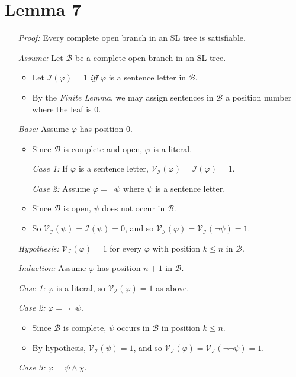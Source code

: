 \documentclass[a4paper, 11pt]{article} %
\newcommand{\I}{\mathcal{I}}
\newcommand{\B}{\mathcal{B}}
\newcommand{\V}[1]{\mathcal{V}_{#1}} %
\begin{document}
\section*{Lemma 7}

\begin{enumerate}
  \item[\it Proof:] Every complete open branch in an SL tree is satisfiable.
  \item[\it Assume:] Let $\B$ be a complete open branch in an SL tree. 
    \begin{itemize}
      \item Let $\I(\varphi)=1$ \textit{iff} $\varphi$ is a sentence letter in $\B$. 
      \item By the \textit{Finite Lemma}, we may assign sentences in $\B$ a position number where the leaf is 0. 
    \end{itemize}
  \item[\it Base:] Assume $\varphi$ has position 0. 
    \begin{itemize}
      \item Since $\B$ is complete and open, $\varphi$ is a literal. 
      \item[\it Case 1:] If $\varphi$ is a sentence letter, $\V{\I}(\varphi)=\I(\varphi)=1$. 
      \item[\it Case 2:] Assume $\varphi=\neg\psi$ where $\psi$ is a sentence letter. 
      \item Since $\B$ is open, $\psi$ does not occur in $\B$.
      \item So $\V{\I}(\psi)=\I(\psi)=0$, and so $\V{\I}(\varphi)=\V{\I}(\neg\psi)=1$.
    \end{itemize}
  \item[\it Hypothesis:] $\V{\I}(\varphi)=1$ for every $\varphi$ with position $k\leq n$ in $\B$. 
  \item[\it Induction:] Assume $\varphi$ has position $n+1$ in $\B$. 
  \item[\it Case 1:] $\varphi$ is a literal, so $\V{\I}(\varphi)=1$ as above.
  \item[\it Case 2:] $\varphi=\neg\neg\psi$.
    \begin{itemize}
      \item Since $\B$ is complete, $\psi$ occurs in $\B$ in position $k\leq n$. 
      \item By hypothesis, $\V{\I}(\psi)=1$, and so $\V{\I}(\varphi)=\V{\I}(\neg\neg\psi)=1$.
    \end{itemize}
  \item[\it Case 3:] $\varphi=\psi\wedge\chi$.

\end{enumerate}
\end{document}
